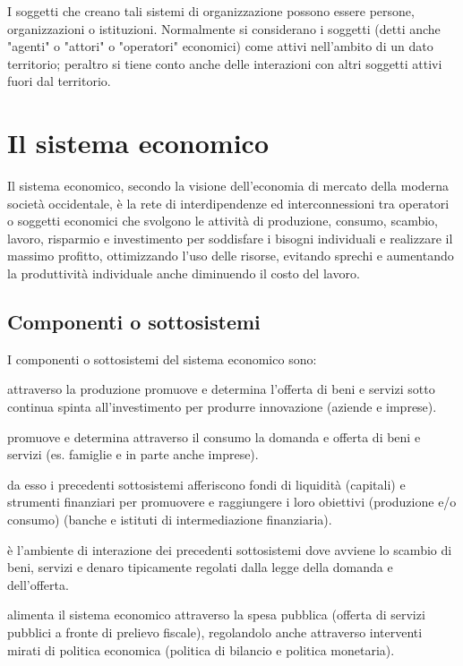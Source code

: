 I soggetti che creano tali sistemi di organizzazione possono essere persone, 
organizzazioni o istituzioni. Normalmente si considerano i soggetti (detti 
anche "agenti" o "attori" o "operatori" economici) come attivi nell'ambito di 
un dato territorio; peraltro si tiene conto anche delle interazioni con altri 
soggetti attivi fuori dal territorio.

\section{Il sistema economico}
\label{sec:modelli_sistemaeconomico}

Il sistema economico, secondo la visione dell'economia di mercato della 
moderna società occidentale, è la rete di interdipendenze ed interconnessioni 
tra operatori o soggetti economici che svolgono le attività di produzione, 
consumo, scambio, lavoro, risparmio e investimento per soddisfare i bisogni 
individuali e realizzare il massimo profitto, ottimizzando l'uso delle 
risorse, evitando sprechi e aumentando la produttività individuale anche 
diminuendo il costo del lavoro.

\pagebreak %

\subsection{Componenti o sottosistemi}

I componenti o sottosistemi del sistema economico sono:

\begin{description} [noitemsep]
 \item [Sistema di produzione:] attraverso la produzione promuove e 
determina l'offerta di beni e servizi sotto 
continua spinta all'investimento per produrre innovazione 
(aziende e imprese).
 \item [Sistema dei consumatori:] promuove e determina 
attraverso il consumo la domanda e offerta di beni e 
servizi (es. famiglie e in parte anche imprese).
 \item [Sistema creditizio-finanziario:] da esso i 
precedenti sottosistemi afferiscono fondi di liquidità (capitali) e 
strumenti finanziari per 
promuovere e raggiungere i loro obiettivi (produzione e/o consumo) 
(banche e istituti di intermediazione finanziaria).
 \item [Mercato:] è l'ambiente di interazione dei precedenti sottosistemi 
dove avviene lo scambio di beni, servizi e denaro tipicamente regolati 
dalla legge della domanda e dell'offerta.
 \item [Stato:] alimenta il sistema economico attraverso la spesa 
pubblica (offerta di servizi pubblici a fronte di prelievo fiscale), 
regolandolo anche attraverso interventi mirati di politica economica 
(politica di bilancio e politica monetaria).
\end{description}

